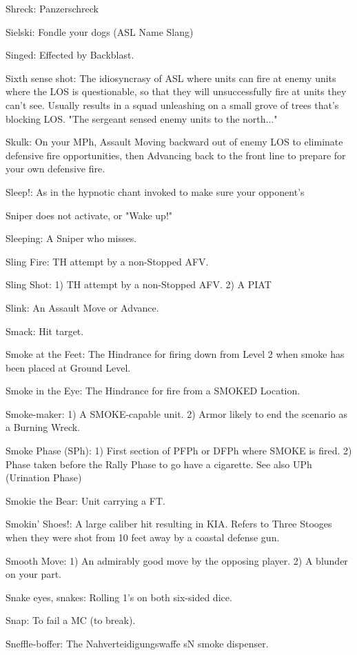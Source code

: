 \documentclass[letterpaper]{article}
\begin{document}
Shreck: Panzerschreck

Sielski: Fondle your dogs (ASL Name Slang)

Singed: Effected by Backblast.

Sixth sense shot: The idiosyncrasy of ASL where units can fire at enemy units where the LOS is questionable, so that they will unsuccessfully fire at units they can't see.  Usually results in a squad unleashing on a small grove of trees that's blocking LOS. "The sergeant sensed enemy units to the north..."

Skulk: On your MPh, Assault Moving backward out of enemy LOS to eliminate defensive fire opportunities, then Advancing back to the front line to prepare for your own defensive fire.

Sleep!: As in the hypnotic chant invoked to make sure your opponent's

Sniper does not activate, or "Wake up!"

Sleeping: A Sniper who misses.

Sling Fire: TH attempt by a non-Stopped AFV.

Sling Shot: 1) TH attempt by a non-Stopped AFV. 2) A PIAT

Slink: An Assault Move or Advance.

Smack: Hit target.

Smoke at the Feet: The Hindrance for firing down from Level 2 when smoke has been placed at Ground Level.

Smoke in the Eye: The Hindrance for fire from a SMOKED Location.

Smoke-maker: 1) A SMOKE-capable unit. 2) Armor likely to end the scenario as a Burning Wreck.

Smoke Phase (SPh): 1) First section of PFPh or DFPh where SMOKE is fired. 2) Phase taken before the Rally Phase to go have a cigarette. See also UPh (Urination Phase)

Smokie the Bear: Unit carrying a FT.

Smokin' Shoes!: A large caliber hit resulting in KIA. Refers to Three Stooges when they were shot from 10 feet away by a coastal defense gun.

Smooth Move: 1) An admirably good move by the opposing player. 2) A blunder on your part.

Snake eyes, snakes: Rolling 1's on both six-sided dice.

Snap: To fail a MC (to break).

Sneffle-boffer: The Nahverteidigungswaffe sN smoke dispenser.
\end{document}
